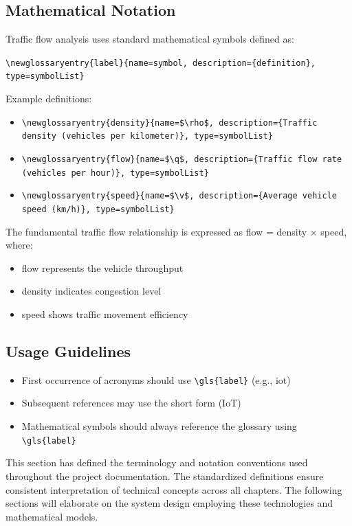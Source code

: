 \documentclass[12pt]{report}
\begin{document}
\subsection{Mathematical Notation}

Traffic flow analysis uses standard mathematical symbols defined as:

\texttt{\textbackslash newglossaryentry\{label\}\{name=symbol, description=\{definition\}, type=symbolList\}}

Example definitions:
\begin{itemize}
    \item \texttt{\textbackslash newglossaryentry\{density\}\{name=\$\textbackslash rho\$, description=\{Traffic density (vehicles per kilometer)\}, type=symbolList\}}
    \item \texttt{\textbackslash newglossaryentry\{flow\}\{name=\$\textbackslash q\$, description=\{Traffic flow rate (vehicles per hour)\}, type=symbolList\}}
    \item \texttt{\textbackslash newglossaryentry\{speed\}\{name=\$\textbackslash v\$, description=\{Average vehicle speed (km/h)\}, type=symbolList\}}
\end{itemize}

The fundamental traffic flow relationship is expressed as \gls{flow} = \gls{density} × \gls{speed}, where:
\begin{itemize}
    \item \gls{flow} represents the vehicle throughput
    \item \gls{density} indicates congestion level
    \item \gls{speed} shows traffic movement efficiency
\end{itemize}

\subsection{Usage Guidelines}
\begin{itemize}
    \item First occurrence of acronyms should use \verb|\gls{label}| (e.g., \gls{iot})
    \item Subsequent references may use the short form (IoT)
    \item Mathematical symbols should always reference the glossary using \verb|\gls{label}|
\end{itemize}

This section has defined the terminology and notation conventions used throughout the project documentation. The standardized definitions ensure consistent interpretation of technical concepts across all chapters. The following sections will elaborate on the system design employing these technologies and mathematical models.
\end{document}
